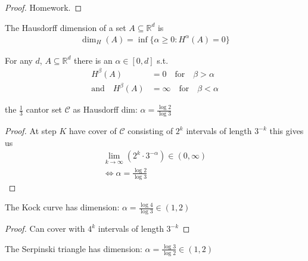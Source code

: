 \begin{proof}
	Homework.
\end{proof}

\begin{definition}
	The Hausdorff dimension of a set $A \subseteq \mathbb{R}^d$ is
	\begin{align*}
		\dim_{H} (A) = \inf\{\alpha \geq 0 : H^{\alpha} (A) = 0 \}
	\end{align*}
\end{definition}

\begin{lemma}
	For any $d$, $A \subseteq \mathbb{R}^d$ there is an $\alpha \in [0,d]$ s.t. 
	\begin{align*}
					H^{\beta} (A) &= 0 \quad \text{for} \quad  \beta > \alpha \\
		\text{and} \quad H^{\beta} (A) &= \infty \quad \text{for} \quad \beta < \alpha
	\end{align*} 
\end{lemma}


\begin{example}
	the $\frac{1}{3}$ cantor set $\mathcal{C}$ as Hausdorff dim: $\alpha = \frac{\log 2}{\log 3}$ 
	\begin{proof}
		At step $K$ have cover of $\mathcal{C}$ consisting of $2^{k}$ intervals of length $3^{-k}$ this gives us 
		\begin{align*}
		\lim_{k \to \infty} (2^{k}\cdot 3^{-\alpha}) \in (0, \infty) \\
		\iff \alpha = \frac{\log 2}{\log 3}
		\end{align*} 
	\end{proof}
	
\end{example}

\begin{example}
	The Kock curve has dimension: $\alpha = \frac{\log 4}{\log 3} \in (1,2)$ 
	\begin{proof}
		Can cover with $4^{k}$ intervals of length $3^{-k}$
	\end{proof}
	
\end{example}

\begin{example}
	The Serpinski triangle has dimension: $\alpha = \frac{\log 3}{\log 2} \in (1,2)$ 
\end{example}


